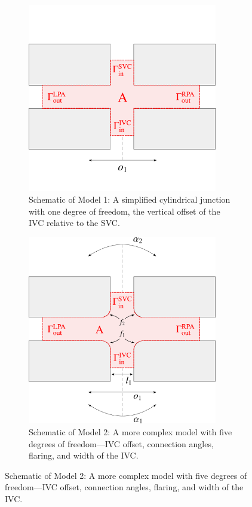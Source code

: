 \begin{figure}[h]
	\begin{subfigure}{0.48\textwidth}
		\centering
		\includegraphics[width=0.91\textwidth, trim={0 0 0 0}]{figures/model1.pdf}
		\caption[Simplified Cylindrical Junction]{Schematic of Model 1: A simplified cylindrical junction with one degree of freedom, the vertical offset of the IVC relative to the SVC.}
		\label{fig:model1_schematic}
	\end{subfigure}\hfill%
	\begin{subfigure}{0.48\textwidth}
		\centering
		\includegraphics[width=0.91\textwidth]{figures/model2.pdf}
		\caption[Complex Geometric Model]{Schematic of Model 2: A more complex model with five degrees of freedom—IVC offset, connection angles, flaring, and width of the IVC.}
		\label{fig:model2_schematic}
	\end{subfigure}
\end{figure}
